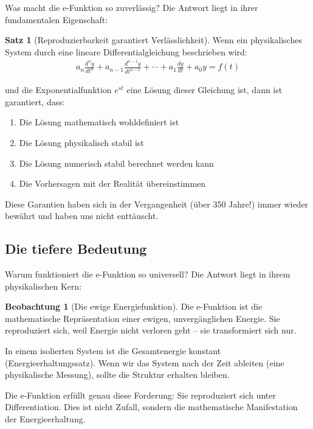\documentclass[a4paper, 12pt, twoside, openright]{report}
\theoremstyle{definition}
\newtheorem{beobachtung}{Beobachtung}
\theoremstyle{definition}
\newtheorem{satz}{Satz}[chapter]
\begin{document}
Was macht die e-Funktion so zuverlässig? Die Antwort liegt in ihrer fundamentalen Eigenschaft:

\begin{satz}[Reproduzierbarkeit garantiert Verlässlichkeit]
	Wenn ein physikalisches System durch eine lineare Differentialgleichung beschrieben wird:
	\begin{align}
		a_n \frac{d^n y}{dt^n} + a_{n-1} \frac{d^{n-1} y}{dt^{n-1}} + \cdots + a_1 \frac{dy}{dt} + a_0 y = f(t)
	\end{align}
	
	und die Exponentialfunktion $e^{st}$ eine Lösung dieser Gleichung ist, dann ist garantiert, dass:
	
	\begin{enumerate}
		\item Die Lösung mathematisch wohldefiniert ist
		\item Die Lösung physikalisch stabil ist
		\item Die Lösung numerisch stabil berechnet werden kann
		\item Die Vorhersagen mit der Realität übereinstimmen
	\end{enumerate}
	
	Diese Garantien haben sich in der Vergangenheit (über 350 Jahre!) immer wieder bewährt und haben uns nicht enttäuscht.
\end{satz}

\subsection{Die tiefere Bedeutung}

Warum funktioniert die e-Funktion so universell? Die Antwort liegt in ihrem physikalischen Kern:

\begin{beobachtung}[Die ewige Energiefunktion]
	Die e-Funktion ist die mathematische Repräsentation einer ewigen, unvergänglichen Energie. Sie reproduziert sich, weil Energie nicht verloren geht -- sie transformiert sich nur.
	
	In einem isolierten System ist die Gesamtenergie konstant (Energieerhaltungssatz). Wenn wir das System nach der Zeit ableiten (eine physikalische Messung), sollte die Struktur erhalten bleiben.
	
	Die e-Funktion erfüllt genau diese Forderung: Sie reproduziert sich unter Differentiation. Dies ist nicht Zufall, sondern die mathematische Manifestation der Energieerhaltung.
\end{beobachtung}
\end{document}
